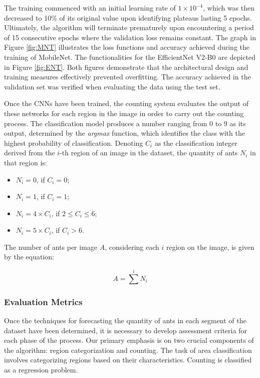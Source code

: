 The training commenced with an initial learning rate of $1 \times 10^{-4}$, which was then decreased to 10\% of its original value upon identifying plateaus lasting 5 epochs. Ultimately, the algorithm will terminate prematurely upon encountering a period of 15 consecutive epochs where the validation loss remains constant. The graph in Figure \ref{fig:MNT} illustrates the loss functions and accuracy achieved during the training of MobileNet. The functionalities for the EfficientNet V2-B0 are depicted in Figure \ref{fig:ENT}. Both figures demonstrate that the architectural design and training measures effectively prevented overfitting. The accuracy achieved in the validation set was verified when evaluating the data using the test set.

Once the CNNs have been trained, the counting system evaluates the output of these networks for each region in the image in order to carry out the counting process. The classification model produces a number ranging from 0 to 9 as its output, determined by the \textit{argmax} function, which identifies the class with the highest probability of classification. Denoting $C_i$ as the classification integer derived from the $i$-th region of an image in the dataset, the quantity of ants $N_i$ in that region is:

\begin{itemize}
    \item $N_i = 0$, if $C_i = 0$;
    \item $N_i = 1$, if $C_i = 1$;
    \item $N_i = 4 \times C_i$, if $2 \leq C_i \leq 6$;
    \item $N_i = 5 \times C_i$, if $C_i > 6$.
\end{itemize}

The number of ants per image $A$, considering each $i$ region on the image, is given by the equation:

\begin{equation}
    A = \sum^i N_i
\end{equation}

\subsubsection{Evaluation Metrics}

Once the techniques for forecasting the quantity of ants in each segment of the dataset have been determined, it is necessary to develop assessment criteria for each phase of the process. Our primary emphasis is on two crucial components of the algorithm: region categorization and counting. The task of area classification involves categorizing regions based on their characteristics. Counting is classified as a regression problem.

